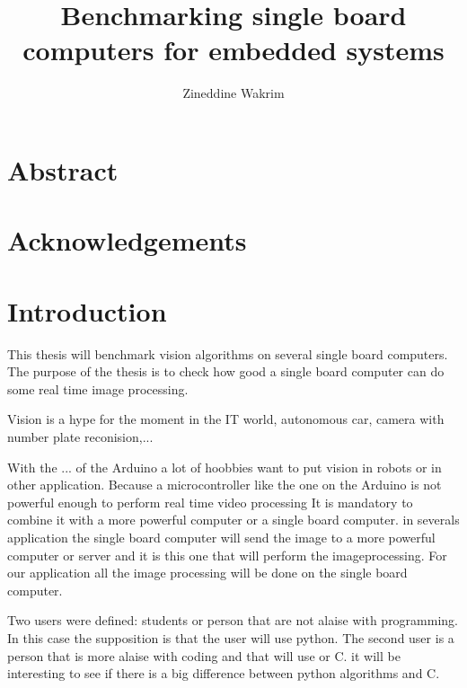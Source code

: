 \documentclass[english]{book_template} %
\title{Benchmarking single board computers for embedded systems}
\author {Zineddine Wakrim} %
\begin{document}
\maketitle
\newpage
  \null
\chapter*{Abstract}
\newpage
  \null
\chapter*{Acknowledgements}

\newpage
  \null

\tableofcontents
\listoffigures
\listoftables

\newpage
  \null

\chapter{Introduction} %

This thesis will benchmark vision algorithms on several single board computers. The purpose of the thesis is to check how good a single board computer can do some real time image processing. 

Vision is a hype for the moment in the IT world, autonomous car, camera with number plate reconision,...

With the ... of the Arduino a lot of hoobbies want to put vision in robots or in other application. Because a microcontroller like the one on the Arduino is not powerful enough to perform real time video processing It is mandatory to combine it with a more powerful computer or a single board computer. in severals application the single board computer will send the image to a more powerful computer or server and it is this one that will perform the imageprocessing. For our application all the image processing will be done on the single board computer.

Two users were defined: students or person that are not alaise with programming. In this case the supposition is that the user will use python. The second user is a person that is more alaise with coding and that will use or C. it will be interesting to see if there is a big difference between python algorithms and C. 
\end{document}
